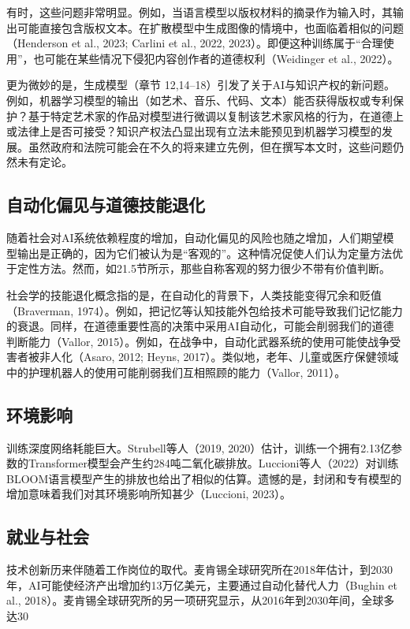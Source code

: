 有时，这些问题非常明显。例如，当语言模型以版权材料的摘录作为输入时，其输出可能直接包含版权文本。在扩散模型中生成图像的情境中，也面临着相似的问题（Henderson et al., 2023; Carlini et al., 2022, 2023）。即便这种训练属于“合理使用”，也可能在某些情况下侵犯内容创作者的道德权利（Weidinger et al., 2022）。

更为微妙的是，生成模型（章节 12,14–18）引发了关于AI与知识产权的新问题。例如，机器学习模型的输出（如艺术、音乐、代码、文本）能否获得版权或专利保护？基于特定艺术家的作品对模型进行微调以复制该艺术家风格的行为，在道德上或法律上是否可接受？知识产权法凸显出现有立法未能预见到机器学习模型的发展。虽然政府和法院可能会在不久的将来建立先例，但在撰写本文时，这些问题仍然未有定论。

\subsection{自动化偏见与道德技能退化}
随着社会对AI系统依赖程度的增加，自动化偏见的风险也随之增加，人们期望模型输出是正确的，因为它们被认为是“客观的”。这种情况促使人们认为定量方法优于定性方法。然而，如21.5节所示，那些自称客观的努力很少不带有价值判断。

社会学的技能退化概念指的是，在自动化的背景下，人类技能变得冗余和贬值（Braverman, 1974）。例如，把记忆等认知技能外包给技术可能导致我们记忆能力的衰退。同样，在道德重要性高的决策中采用AI自动化，可能会削弱我们的道德判断能力（Vallor, 2015）。例如，在战争中，自动化武器系统的使用可能使战争受害者被非人化（Asaro, 2012; Heyns, 2017）。类似地，老年、儿童或医疗保健领域中的护理机器人的使用可能削弱我们互相照顾的能力（Vallor, 2011）。

\subsection{环境影响}
训练深度网络耗能巨大。Strubell等人（2019, 2020）估计，训练一个拥有2.13亿参数的Transformer模型会产生约284吨二氧化碳排放。Luccioni等人（2022）对训练BLOOM语言模型产生的排放也给出了相似的估算。遗憾的是，封闭和专有模型的增加意味着我们对其环境影响所知甚少（Luccioni, 2023）。

\subsection{就业与社会}
技术创新历来伴随着工作岗位的取代。麦肯锡全球研究所在2018年估计，到2030年，AI可能使经济产出增加约13万亿美元，主要通过自动化替代人力（Bughin et al., 2018）。麦肯锡全球研究所的另一项研究显示，从2016年到2030年间，全球多达30%

